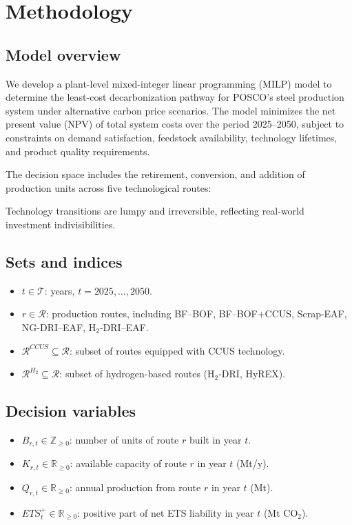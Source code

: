 \documentclass[preprint,5p,authoryear]{elsarticle}
\begin{document}
\section{Methodology}

\subsection{Model overview}
We develop a plant-level mixed-integer linear programming (MILP) model to determine the least-cost decarbonization pathway for POSCO's steel production system under alternative carbon price scenarios. The model minimizes the net present value (NPV) of total system costs over the period 2025–2050, subject to constraints on demand satisfaction, feedstock availability, technology lifetimes, and product quality requirements. 

The decision space includes the retirement, conversion, and addition of production units across five technological routes: 

Technology transitions are lumpy and irreversible, reflecting real-world investment indivisibilities.

\subsection{Sets and indices}
\begin{itemize}[leftmargin=*]
    \item $t \in \mathcal{T}$: years, $t = 2025, \dots, 2050$.
    \item $r \in \mathcal{R}$: production routes, including BF--BOF, BF--BOF+CCUS, Scrap-EAF, NG-DRI--EAF, H$_2$-DRI--EAF.
    \item $\mathcal{R}^{CCUS} \subseteq \mathcal{R}$: subset of routes equipped with CCUS technology.
    \item $\mathcal{R}^{H_2} \subseteq \mathcal{R}$: subset of hydrogen-based routes (H$_2$-DRI, HyREX).
\end{itemize}

\subsection{Decision variables}
\begin{itemize}[leftmargin=*]
    \item $B_{r,t} \in \mathbb{Z}_{\ge 0}$: number of units of route $r$ built in year $t$.
    \item $K_{r,t} \in \mathbb{R}_{\ge 0}$: available capacity of route $r$ in year $t$ (Mt/y).
    \item $Q_{r,t} \in \mathbb{R}_{\ge 0}$: annual production from route $r$ in year $t$ (Mt).
    \item $ETS_{t}^{+} \in \mathbb{R}_{\ge 0}$: positive part of net ETS liability in year $t$ (Mt CO$_2$).
\end{itemize}
\end{document}
